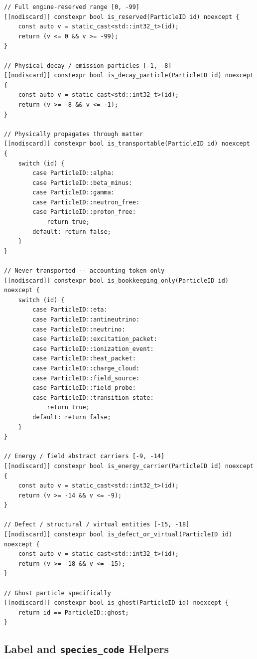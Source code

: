 \documentclass[11pt,a4paper]{article}
\begin{document}
\begin{lstlisting}[style=cpp20,
  caption={Constexpr sub-range predicates}]
// Full engine-reserved range [0, -99]
[[nodiscard]] constexpr bool is_reserved(ParticleID id) noexcept {
    const auto v = static_cast<std::int32_t>(id);
    return (v <= 0 && v >= -99);
}

// Physical decay / emission particles [-1, -8]
[[nodiscard]] constexpr bool is_decay_particle(ParticleID id) noexcept {
    const auto v = static_cast<std::int32_t>(id);
    return (v >= -8 && v <= -1);
}

// Physically propagates through matter
[[nodiscard]] constexpr bool is_transportable(ParticleID id) noexcept {
    switch (id) {
        case ParticleID::alpha:
        case ParticleID::beta_minus:
        case ParticleID::gamma:
        case ParticleID::neutron_free:
        case ParticleID::proton_free:
            return true;
        default: return false;
    }
}

// Never transported -- accounting token only
[[nodiscard]] constexpr bool is_bookkeeping_only(ParticleID id) noexcept {
    switch (id) {
        case ParticleID::eta:
        case ParticleID::antineutrino:
        case ParticleID::neutrino:
        case ParticleID::excitation_packet:
        case ParticleID::ionization_event:
        case ParticleID::heat_packet:
        case ParticleID::charge_cloud:
        case ParticleID::field_source:
        case ParticleID::field_probe:
        case ParticleID::transition_state:
            return true;
        default: return false;
    }
}

// Energy / field abstract carriers [-9, -14]
[[nodiscard]] constexpr bool is_energy_carrier(ParticleID id) noexcept {
    const auto v = static_cast<std::int32_t>(id);
    return (v >= -14 && v <= -9);
}

// Defect / structural / virtual entities [-15, -18]
[[nodiscard]] constexpr bool is_defect_or_virtual(ParticleID id) noexcept {
    const auto v = static_cast<std::int32_t>(id);
    return (v >= -18 && v <= -15);
}

// Ghost particle specifically
[[nodiscard]] constexpr bool is_ghost(ParticleID id) noexcept {
    return id == ParticleID::ghost;
}
\end{lstlisting}

\subsection{Label and \texttt{species\_code} Helpers}
\end{document}
